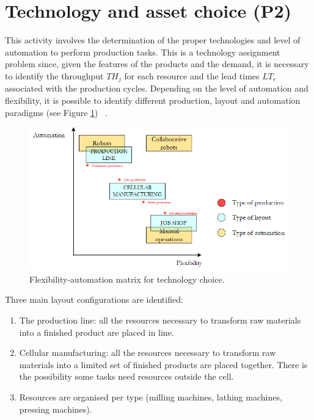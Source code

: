 \section{Technology and asset choice (P2)} \label{secTechChoiceProd}
This activity involves the determination of the proper technologies and level of automation to perform production tasks. This is a technology assignment problem  since, given the features of the products and the demand, it is necessary to identify the throughput $TH_j$ for each resource and the lead times $LT_e$ associated with the production cycles. Depending on the level of automation and flexibility, it is possible to identify different production, layout and automation paradigms (see Figure \ref{fig_prod_flexauto1}) ~\cite{Groover2015}.


\begin{figure}[hbt!]
\centering
\includegraphics[width=1.0\textwidth]{sectionProduction/design_plant_figures/fig_prod_flexauto1.png}
\captionsetup{type=figure}
\caption{Flexibility-automation matrix for technology choice.}
\label{fig_prod_flexauto1}
\end{figure}

Three main layout configurations are identified:

\begin{enumerate}
    \item The production line: all the resources necessary to transform raw materials into a finished product are placed in line.
    \item Cellular manufacturing: all the resources necessary to transform raw materials into a limited set of finished products are placed together. There is the possibility some tasks need resources outside the cell.
    \item Resources are organised per type (milling machines, lathing machines, pressing machines).

\end{enumerate}

